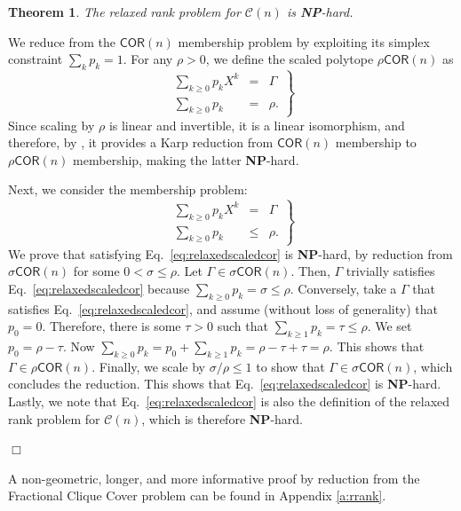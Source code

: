 \documentclass[envcountsect,envcountsame]{svjour3}
\theoremstyle{changebreak}                %
\newtheorem{theorem}[result]{Theorem}
\newenvironment{proof}
 {{\sl Proof.}\hspace*{1 ex}}%
 {{\nopagebreak\hspace*{\fill}$\Box$\par\vspace{12pt}}}
\newcommand{\COR}[1]{\mathsf{COR}(#1)}
\newcommand{\CONX}[1]{\mathcal{C}(#1)}
\begin{document}
\begin{theorem}
  The relaxed rank problem for $\CONX{n}$ is \textbf{NP}-hard.
  \label{thm:rrank}
\end{theorem}
\begin{proof}
We reduce from the $\COR{n}$ membership problem by exploiting its simplex constraint $\sum_k p_k=1$. For any $\rho>0$, we define the scaled polytope $\rho\COR{n}$ as
\begin{equation}
  \left.\begin{array}{rcl}
    \sum\limits_{k\ge 0} p_k X^k &=& \Gamma \\
    \sum\limits_{k\ge 0} p_k &= & \rho.
    \end{array}\right\} \label{eq:scaledcor}
\end{equation}
Since scaling by $\rho$ is linear and invertible, it is a linear isomorphism, and therefore, by \cite{gls}, it provides a Karp reduction from $\COR{n}$ membership to $\rho\COR{n}$ membership, making the latter \textbf{NP}-hard.

Next, we consider the membership problem:
\begin{equation}
  \left.\begin{array}{rcl}
    \sum\limits_{k\ge 0} p_k X^k &=& \Gamma \\
    \sum\limits_{k\ge 0} p_k &\le & \rho.
    \end{array}\right\} \label{eq:relaxedscaledcor}
\end{equation}
We prove that satisfying Eq.~\eqref{eq:relaxedscaledcor} is \textbf{NP}-hard, by reduction from $\sigma\COR{n}$ for some $0<\sigma\le\rho$. Let $\Gamma\in\sigma\COR{n}$. Then, $\Gamma$ trivially satisfies Eq.~\eqref{eq:relaxedscaledcor} because $\sum_{k\ge 0}p_k=\sigma\le\rho$. Conversely, take a $\Gamma$ that satisfies Eq.~\eqref{eq:relaxedscaledcor}, and assume (without loss of generality) that $p_0=0$. Therefore, there is some $\tau>0$ such that $\sum\limits_{k\ge 1}p_k=\tau\le\rho$. We set $p_0=\rho-\tau$. Now $\sum\limits_{k\ge 0} p_k=p_0+\sum\limits_{k\ge 1} p_k=\rho-\tau+\tau=\rho$. This shows that $\Gamma\in\rho\COR{n}$. Finally, we scale by $\sigma/\rho\le 1$ to show that $\Gamma\in\sigma\COR{n}$, which concludes the reduction. This shows that Eq.~\eqref{eq:relaxedscaledcor} is \textbf{NP}-hard. Lastly, we note that Eq.~\eqref{eq:relaxedscaledcor} is also the definition of the relaxed rank problem for $\CONX{n}$, which is therefore \textbf{NP}-hard. 
\end{proof}
A non-geometric, longer, and more informative proof by reduction from the {\sc Fractional Clique Cover} problem can be found in Appendix \ref{a:rrank}.
\end{document}
